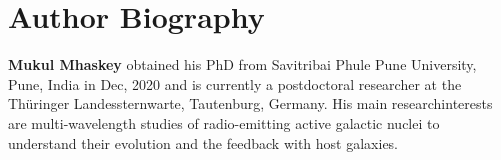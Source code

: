 \documentclass[proof]{WileyASNA-v1}
\begin{document}











%

\section*{Author Biography}
\begin{biography}{}{\textbf{Mukul Mhaskey} obtained his PhD from Savitribai Phule Pune University, Pune, India in Dec, 2020 and is currently a postdoctoral researcher at the Th\"uringer Landessternwarte, Tautenburg, Germany. His main researchinterests are multi-wavelength studies of radio-emitting active galactic nuclei to understand their evolution and the feedback with host galaxies.}
\end{biography}
\end{document}
